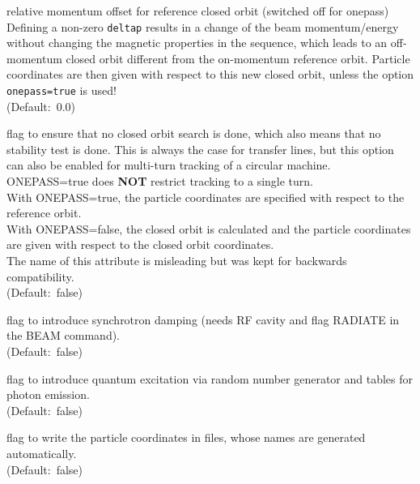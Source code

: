 \begin{madlist}
   relative momentum offset for reference closed orbit (switched
  off for onepass) \\  
  Defining a non-zero \texttt{deltap} results in a change of the beam
  momentum/energy without changing the magnetic properties in the
  sequence, which leads to an off-momentum closed orbit different from
  the on-momentum reference orbit. Particle coordinates are then given
  with respect to this new closed orbit, unless the option
  \texttt{onepass=true} is used! \\  
  (Default:~0.0)

   flag to ensure that no closed orbit search is done,
  which also means that no stability test is done. This is always the
  case for transfer lines, but this option can also be enabled for
  multi-turn tracking of a circular machine. ONEPASS=true does {\bf NOT}
  restrict tracking to a single turn. \\
  With ONEPASS=true, the particle coordinates are specified with
  respect to the reference orbit. \\  
  With ONEPASS=false, the closed orbit is calculated and the particle
  coordinates are given with respect to the closed orbit coordinates.\\
  The name of this attribute is misleading but was kept for backwards
  compatibility.  \\ 
  (Default:~false)

   flag to introduce synchrotron damping (needs RF cavity
  and flag RADIATE in the BEAM command). \\ (Default:~false)

   flag to introduce quantum excitation via random
  number generator and tables for photon emission. \\ (Default:~false)

   flag to write the particle coordinates in files, whose
  names are generated automatically. \\ (Default:~false)


\end{madlist}
